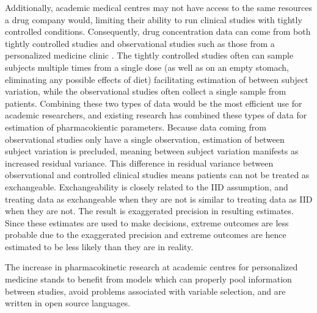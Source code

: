 Additionally, academic medical centres may not have access to the same resources a drug company would, limiting their ability to run clinical studies with tightly controlled conditions.  Consequently, drug concentration data can come from both tightly controlled studies \cite{tirona2018apixaban} and observational studies such as those from a personalized medicine clinic \cite{sukumar2019apixaban, gulilat2020drug}. The tightly controlled studies often can sample subjects multiple times from a single dose (as well as on an empty stomach, eliminating any possible effects of diet) facilitating estimation of between subject variation, while the observational studies often collect a single sample from patients. Combining these two types of data would be the most efficient use for academic researchers, and existing research \cite{cirincione2018population} has combined these types of data for estimation of pharmacokientic parameters.  Because data coming from observational studies only have a single observation, estimation of between subject variation is precluded, meaning between subject variation manifests as increased residual variance.  This difference in residual variance between observational and controlled clinical studies means patients can not be treated as exchangeable. Exchangeability is closely related to the IID assumption, and treating data as exchangeable when they are not is similar to treating data as IID when they are not.  The result is exaggerated precision in resulting estimates.  Since these estimates are used to make decisions, extreme outcomes are less probable due to the exaggerated precision and extreme outcomes are hence estimated to be less likely than they are in reality.

The increase in pharmacokinetic research at academic centres for personalized medicine stands to benefit from models which can properly pool information between studies, avoid problems associated with variable selection, and are written in open source languages.